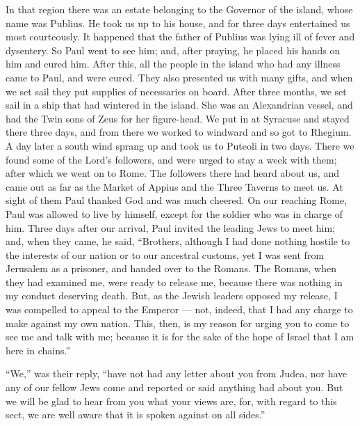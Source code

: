  In that region there was an estate belonging to the
Governor of the island, whose name was Publius. He took us up to his
house, and for three days entertained us most courteously. 
It happened that the father of Publius was lying ill of fever and
dysentery. So Paul went to see him; and, after praying, he placed his
hands on him and cured him.  After this, all the people in
the island who had any illness came to Paul, and were cured.
 They also presented us with many gifts, and when we set
sail they put supplies of necessaries on board.  After
three months, we set sail in a ship that had wintered in the island. She
was an Alexandrian vessel, and had the Twin sons of Zeus for her
figure-head.  We put in at Syracuse and stayed there three
days,  and from there we worked to windward and so got to
Rhegium. A day later a south wind sprang up and took us to Puteoli in
two days.  There we found some of the Lord's followers, and
were urged to stay a week with them; after which we went on to Rome.
 The followers there had heard about us, and came out as
far as the Market of Appius and the Three Taverns to meet us. At sight
of them Paul thanked God and was much cheered.  On our
reaching Rome, Paul was allowed to live by himself, except for the
soldier who was in charge of him.  Three days after our
arrival, Paul invited the leading Jews to meet him; and, when they came,
he said, ``Brothers, although I had done nothing hostile to the
interests of our nation or to our ancestral customs, yet I was sent from
Jerusalem as a prisoner, and handed over to the Romans. 
The Romans, when they had examined me, were ready to release me, because
there was nothing in my conduct deserving death.  But, as
the Jewish leaders opposed my release, I was compelled to appeal to the
Emperor --- not, indeed, that I had any charge to make against my own
nation.  This, then, is my reason for urging you to come to
see me and talk with me; because it is for the sake of the hope of
Israel that I am here in chains.''

 ``We,'' was their reply, ``have not had any letter about
you from Judea, nor have any of our fellow Jews come and reported or
said anything bad about you.  But we will be glad to hear
from you what your views are, for, with regard to this sect, we are well
aware that it is spoken against on all sides.''

